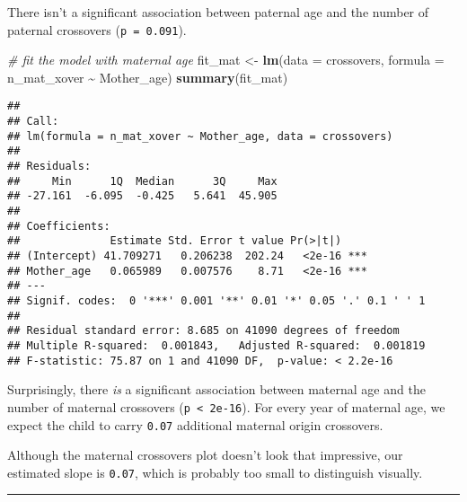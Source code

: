 \documentclass[
]{article}
\newenvironment{Shaded}{\begin{snugshade}}{\end{snugshade}}
\newcommand{\AttributeTok}[1]{\textcolor[rgb]{0.13,0.29,0.53}{#1}}
\newcommand{\CommentTok}[1]{\textcolor[rgb]{0.56,0.35,0.01}{\textit{#1}}}
\newcommand{\FunctionTok}[1]{\textcolor[rgb]{0.13,0.29,0.53}{\textbf{#1}}}
\newcommand{\NormalTok}[1]{#1}
\newcommand{\OtherTok}[1]{\textcolor[rgb]{0.56,0.35,0.01}{#1}}
\newcommand{\SpecialCharTok}[1]{\textcolor[rgb]{0.81,0.36,0.00}{\textbf{#1}}}
\begin{document}
There isn't a significant association between paternal age and the
number of paternal crossovers (\texttt{p\ =\ 0.091}).

\begin{Shaded}
\begin{Highlighting}[]
\CommentTok{\# fit the model with maternal age}
\NormalTok{fit\_mat }\OtherTok{\textless{}{-}} \FunctionTok{lm}\NormalTok{(}\AttributeTok{data =}\NormalTok{ crossovers,}
              \AttributeTok{formula =}\NormalTok{ n\_mat\_xover }\SpecialCharTok{\textasciitilde{}}\NormalTok{ Mother\_age)}
\FunctionTok{summary}\NormalTok{(fit\_mat)}
\end{Highlighting}
\end{Shaded}

\begin{verbatim}
## 
## Call:
## lm(formula = n_mat_xover ~ Mother_age, data = crossovers)
## 
## Residuals:
##     Min      1Q  Median      3Q     Max 
## -27.161  -6.095  -0.425   5.641  45.905 
## 
## Coefficients:
##              Estimate Std. Error t value Pr(>|t|)    
## (Intercept) 41.709271   0.206238  202.24   <2e-16 ***
## Mother_age   0.065989   0.007576    8.71   <2e-16 ***
## ---
## Signif. codes:  0 '***' 0.001 '**' 0.01 '*' 0.05 '.' 0.1 ' ' 1
## 
## Residual standard error: 8.685 on 41090 degrees of freedom
## Multiple R-squared:  0.001843,   Adjusted R-squared:  0.001819 
## F-statistic: 75.87 on 1 and 41090 DF,  p-value: < 2.2e-16
\end{verbatim}

Surprisingly, there \emph{is} a significant association between maternal
age and the number of maternal crossovers
(\texttt{p\ \textless{}\ 2e-16}). For every year of maternal age, we
expect the child to carry \texttt{0.07} additional maternal origin
crossovers.

Although the maternal crossovers plot doesn't look that impressive, our
estimated slope is \texttt{0.07}, which is probably too small to
distinguish visually.

\begin{center}\rule{0.5\linewidth}{0.5pt}\end{center}
\end{document}
